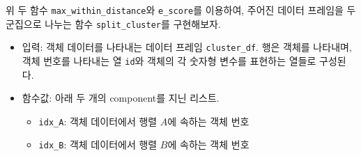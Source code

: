 \documentclass[]{book}
\providecommand{\tightlist}{%
  \setlength{\itemsep}{0pt}\setlength{\parskip}{0pt}}
\begin{document}
위 두 함수 \texttt{max\_within\_distance}와 \texttt{e\_score}를 이용하여, 주어진 데이터 프레임을 두 군집으로 나누는 함수 \texttt{split\_cluster}를 구현해보자.

\begin{itemize}
\tightlist
\item
  입력: 객체 데이터를 나타내는 데이터 프레임 \texttt{cluster\_df}. 행은 객체를 나타내며, 객체 번호를 나타내는 열 \texttt{id}와 객체의 각 숫자형 변수를 표현하는 열들로 구성된다.
\item
  함수값: 아래 두 개의 component를 지닌 리스트.

  \begin{itemize}
  \tightlist
  \item
    \texttt{idx\_A}: 객체 데이터에서 행렬 \(A\)에 속하는 객체 번호
  \item
    \texttt{idx\_B}: 객체 데이터에서 행렬 \(B\)에 속하는 객체 번호
  \end{itemize}
\end{itemize}
\end{document}
